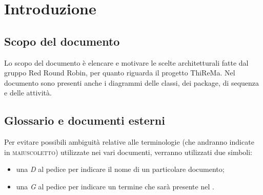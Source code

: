\section{Introduzione}
	\subsection{Scopo del documento}
		Lo scopo del documento è elencare e motivare le scelte architetturali fatte dal gruppo Red Round Robin, per quanto riguarda il progetto ThiReMa. Nel documento sono presenti anche i diagrammi delle classi, dei package, di sequenza e delle attività.
	\subsection{Glossario e documenti esterni}
		Per evitare possibili ambiguità relative alle terminologie (che andranno indicate in \textsc{maiuscoletto}) utilizzate nei vari documenti, verranno utilizzati due simboli:
		\begin{itemize}
			\item una \textit{D} al pedice per indicare il nome di un particolare documento;
			\item una \textit{G} al pedice per indicare un termine che sarà presente nel .
		\end{itemize}
	